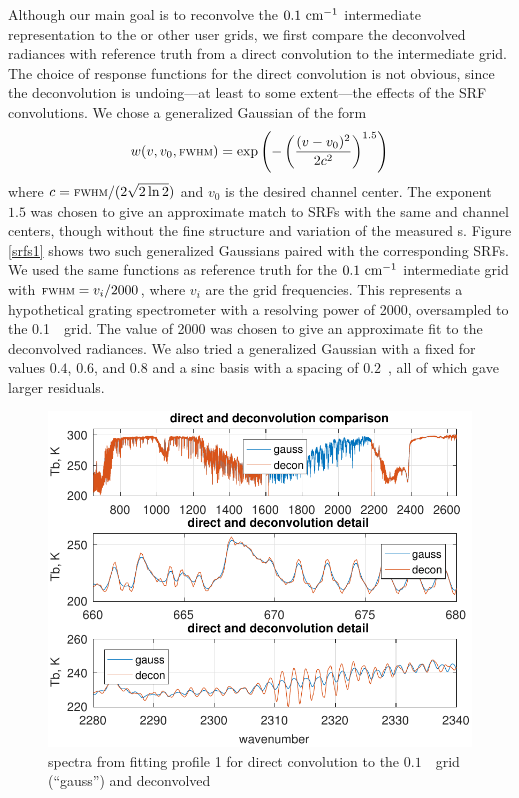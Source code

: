 \documentclass[10pt,twocolumn]{article}  %
\begin{document}
Although our main goal is to reconvolve the $0.1~\mbox{cm$^{-1}$}$ intermediate
representation to the {\cris} or other user grids, we first compare
the deconvolved radiances with reference truth from a direct
convolution to the intermediate grid.  The choice of response
functions for the direct convolution is not obvious, since the
deconvolution is undoing---at least to some extent---the effects of
the {\airs} SRF convolutions.  We chose a generalized Gaussian 
\cite{wiki:gauss} of the form
\[w(v, v_0, \mbox{\small\textsc{fwhm}}) = 
\exp\left(-\left(\frac{(v - v_0)^2}{2c^2}\right)^{1.5}\right) \]
where $c=\mbox{\small\textsc{fwhm}} / (2\sqrt{2\ln 2})$ and $v_0$ is the desired channel
center.  The exponent $1.5$ was chosen to give an approximate match
to {\airs} SRFs with the same {\FWHM} and channel centers, though
without the fine structure and variation of the measured \srf s.
Figure \ref{srfs1} shows two such generalized Gaussians paired with
the corresponding {\airs} SRFs.  We used the same functions as
reference truth for the $0.1~\mbox{cm$^{-1}$}$ intermediate grid with ${\mbox{\small\textsc{fwhm}}} =
v_i / 2000$, where $v_i$ are the grid frequencies.  This represents
a hypothetical grating spectrometer with a resolving power of 2000,
oversampled to the 0.1~\wn\ grid.  The value of 2000 was chosen to
give an approximate fit to the deconvolved radiances.  We also tried
a generalized Gaussian with a fixed {\FWHM} for values $0.4$, $0.6$,
and $0.8$ and a sinc basis with a spacing of $0.2$~\wn, all of which
gave larger residuals.

\begin{figure} %
  \centering
  \includegraphics[width=\linewidth]{figures/airs_decon_spec.pdf}
  \caption{spectra from fitting profile 1 for direct convolution to
    the $0.1$~\wn\ grid (``gauss'') and deconvolved {\airs}}
  \label{dspec}
\end{figure}
\end{document}
